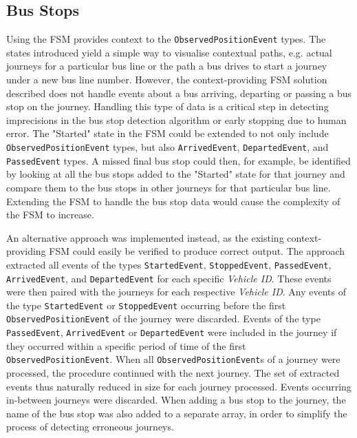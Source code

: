 \subsection{Bus Stops}
Using the FSM provides context to the \texttt{ObservedPositionEvent} types.
The states introduced yield a simple way to visualise contextual paths, e.g. actual journeys for a particular bus line or the path a bus drives to start a journey under a new bus line number.
However, the context-providing FSM solution described does not handle events about a bus arriving, departing or passing a bus stop on the journey.
Handling this type of data is a critical step in detecting imprecisions in the bus stop detection algorithm or early stopping due to human error.
The "Started" state in the FSM could be extended to not only include \texttt{ObservedPositionEvent} types, but also \texttt{ArrivedEvent}, \texttt{DepartedEvent}, and \texttt{PassedEvent} types.
A missed final bus stop could then, for example, be identified by looking at all the bus stops added to the "Started" state for that journey and compare them to the bus stops in other journeys for that particular bus line.
Extending the FSM to handle the bus stop data would cause the complexity of the FSM to increase.

An alternative approach was implemented instead, as the existing context-providing FSM could easily be verified to produce correct output.
The approach extracted all events of the types \texttt{StartedEvent}, \texttt{StoppedEvent}, \texttt{PassedEvent}, \texttt{ArrivedEvent}, and \texttt{DepartedEvent} for each specific \textit{Vehicle ID}.
These events were then paired with the journeys for each respective \textit{Vehicle ID}.
Any events of the type \texttt{StartedEvent} or \texttt{StoppedEvent} occurring before the first \texttt{ObservedPositionEvent} of the journey were discarded.
Events of the type \texttt{PassedEvent}, \texttt{ArrivedEvent} or \texttt{DepartedEvent} were included in the journey if they occurred within a specific period of time of the first \texttt{ObservedPositionEvent}. 
When all \texttt{ObservedPositionEvent}s of a journey were processed, the procedure continued with the next journey.
The set of extracted events thus naturally reduced in size for each journey processed.
Events occurring in-between journeys were discarded.
When adding a bus stop to the journey, the name of the bus stop was also added to a separate array, in order to simplify the process of detecting erroneous journeys.

